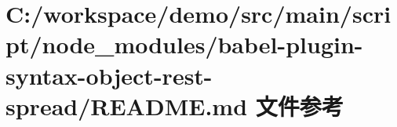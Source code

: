 \hypertarget{node__modules_2babel-plugin-syntax-object-rest-spread_2_r_e_a_d_m_e_8md}{}\section{C\+:/workspace/demo/src/main/script/node\+\_\+modules/babel-\/plugin-\/syntax-\/object-\/rest-\/spread/\+R\+E\+A\+D\+ME.md 文件参考}
\label{node__modules_2babel-plugin-syntax-object-rest-spread_2_r_e_a_d_m_e_8md}
